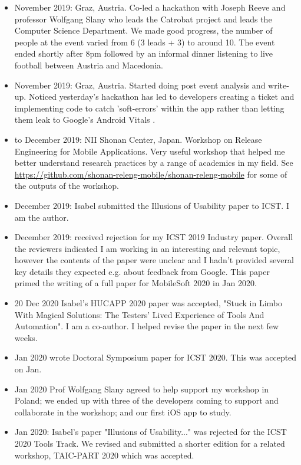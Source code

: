 \begin{itemize}
    \item {} November 2019: Graz, Austria. Co-led a hackathon with Joseph Reeve and professor Wolfgang Slany who leads the Catrobat project and leads the Computer Science Department. We made good progress, the number of people at the event varied from 6 (3 leads + 3) to around 10. The event ended shortly after 8pm followed by an informal dinner listening to live football between Austria and Macedonia.
    \item {} November 2019: Graz, Austria. Started doing post event analysis and write-up. Noticed yesterday's hackathon has led to developers creating a ticket and implementing code to catch 'soft-errors' within the app rather than letting them leak to Google's Android Vitals \cite{CATDROID-426-JIRA}.
    \item {} to  December 2019: NII Shonan Center, Japan. Workshop on Release Engineering for Mobile Applications. Very useful workshop that helped me better understand research practices by a range of academics in my field. See \url{https://github.com/shonan-releng-mobile/shonan-releng-mobile} for some of the outputs of the workshop.
    \item {} December 2019: Isabel submitted the Illusions of Usability paper to ICST. I am the  author.
    \item {} December 2019: received rejection for my ICST 2019 Industry paper. Overall the reviewers indicated I am working in an interesting and relevant topic, however the contents of the paper were unclear and I hadn't provided several key details they expected e.g. about feedback from Google. This paper primed the writing of a full paper for MobileSoft 2020 in Jan 2020.
    \item 20 Dec 2020 Isabel's HUCAPP 2020 paper was accepted, "Stuck in Limbo With Magical Solutions: The Testers' Lived Experience of Tools And Automation". I am a co-author. I helped revise the paper in the next few weeks.
    \item Jan 2020 wrote Doctoral Symposium paper for ICST 2020. This was accepted on  Jan.
    \item Jan 2020 Prof Wolfgang Slany agreed to help support my workshop in Poland; we ended up with three of the developers coming to support and collaborate in the workshop; and our first iOS app to study.
    \item {} Jan 2020: Isabel's paper "Illusions of Usability..." was rejected for the ICST 2020 Tools Track. We revised and submitted a shorter edition for a related workshop, TAIC-PART 2020 which was accepted.

\end{itemize}
